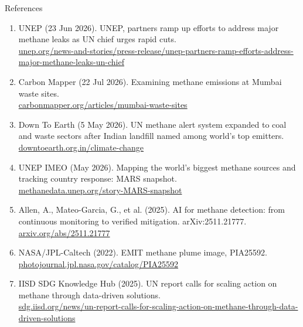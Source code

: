 \documentclass[aspectratio=169,10pt]{beamer}
\begin{document}
\begin{frame}[t]{References}
\scriptsize
\begin{enumerate}\setlength\itemsep{5pt}
\item[{[1]}] UNEP (23 Jun 2026). UNEP, partners ramp up efforts to address major methane leaks as UN chief urges rapid cuts.\\ \href{https://www.unep.org/news-and-stories/press-release/unep-partners-ramp-efforts-address-major-methane-leaks-un-chief}{\color{teal}unep.org/news-and-stories/press-release/unep-partners-ramp-efforts-address-major-methane-leaks-un-chief}
\item[{[2]}] Carbon Mapper (22 Jul 2026). Examining methane emissions at Mumbai waste sites.\\ \href{https://carbonmapper.org/articles/mumbai-waste-sites}{\color{teal}carbonmapper.org/articles/mumbai-waste-sites}
\item[{[3]}] Down To Earth (5 May 2026). UN methane alert system expanded to coal and waste sectors after Indian landfill named among world's top emitters.\\ \href{https://www.downtoearth.org.in/climate-change}{\color{teal}downtoearth.org.in/climate-change}
\item[{[4]}] UNEP IMEO (May 2026). Mapping the world's biggest methane sources and tracking country response: MARS snapshot.\\ \href{https://methanedata.unep.org/story-MARS-snapshot}{\color{teal}methanedata.unep.org/story-MARS-snapshot}
\item[{[5]}] Allen, A., Mateo-Garcia, G., et al. (2025). AI for methane detection: from continuous monitoring to verified mitigation. arXiv:2511.21777.\\ \href{https://arxiv.org/abs/2511.21777}{\color{teal}arxiv.org/abs/2511.21777}
\item[{[6]}] NASA/JPL-Caltech (2022). EMIT methane plume image, PIA25592.\\ \href{https://photojournal.jpl.nasa.gov/catalog/PIA25592}{\color{teal}photojournal.jpl.nasa.gov/catalog/PIA25592}
\item[{[7]}] IISD SDG Knowledge Hub (2025). UN report calls for scaling action on methane through data-driven solutions.\\ \href{https://sdg.iisd.org/news/un-report-calls-for-scaling-action-on-methane-through-data-driven-solutions}{\color{teal}sdg.iisd.org/news/un-report-calls-for-scaling-action-on-methane-through-data-driven-solutions}
\end{enumerate}
\end{frame}
\end{document}
